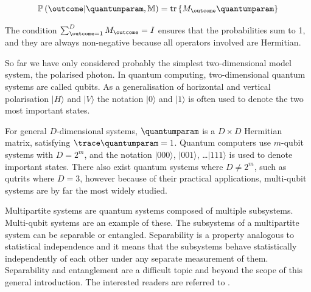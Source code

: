 \begin{equation}
	\mathbb{P}\left(\outcome\vert\quantumparam,\mathbb{M}\right) = \text{tr}\left\{M_{\outcome}\quantumparam \right\}
\end{equation}

The condition $\sum_{\outcome=1}^{D} M_{\outcome} = I$ ensures that the probabilities sum to 1, and they are always non-negative because all operators involved are Hermitian.

So far we have only considered probably the simplest two-dimensional model system, the polarised photon. In quantum computing, two-dimensional quantum systems are called qubits. As a generalisation of horizontal and vertical polarisation $\vert H \rangle$ and $\vert V \rangle$ the notation $\vert 0 \rangle$ and $\vert 1 \rangle$ is often used to denote the two most important states.

For general $D$-dimensional systems, $\quantumparam$ is a $D \times D$ Hermitian matrix, satisfying $\trace\quantumparam = 1$. Quantum computers use $m$-qubit systems with $D=2^m$, and the notation $\vert 000 \rangle$, $\vert 001 \rangle$, \ldots $\vert 111 \rangle$ is used to denote important states. There also exist quantum systems where $D\neq 2^m$, such as qutrits where $D=3$, however because of their practical applications, multi-qubit systems are by far the most widely studied.

Multipartite systems are quantum systems composed of multiple subsystems. Multi-qubit systems are an example of these. The subsystems of a multipartite system can be separable or entangled. Separability is a property analogous to statistical independence and it means that the subsystems behave statistically independently of each other under any separate measurement of them. Separability and entanglement are a difficult topic and beyond the scope of this general introduction. The interested readers are referred to \citep[Chapter 4]{Petz2008}.


